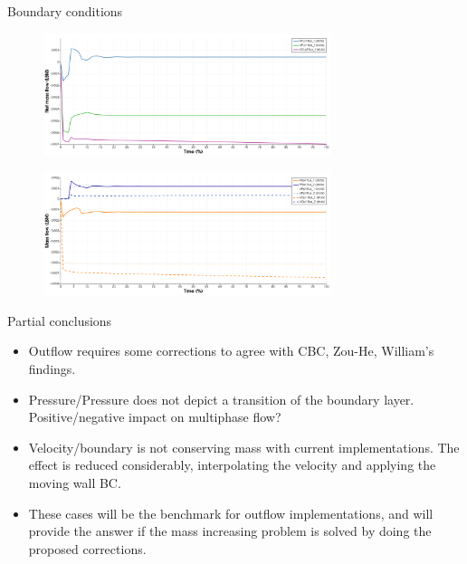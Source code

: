 \documentclass{beamer}
\begin{document}
	\begin{frame}{Boundary conditions}
		\begin{figure}
			\centering
			\includegraphics[width=0.75\textwidth]{pics/channelBCComparisionNetFlow.png}
		\end{figure}
		\begin{figure}
			\centering
			\includegraphics[width=0.75\textwidth]{pics/channelBCComparisionBndFlow.png}
		\end{figure}
			
	\end{frame}

	\begin{frame}{Partial conclusions}
		\begin{itemize}
			\item Outflow requires some corrections to agree with CBC, Zou-He, William's findings.
			
			\item Pressure/Pressure does not depict a transition of the boundary layer. Positive/negative impact on multiphase flow?
			
			\item Velocity/boundary is not conserving mass with current implementations. The effect is reduced considerably, interpolating the velocity and applying the moving wall BC.
			
			\item These cases will be the benchmark for outflow implementations, and will provide the answer if the mass increasing problem is solved by doing the proposed corrections.  
		\end{itemize}
	\end{frame}
	
\end{document}
